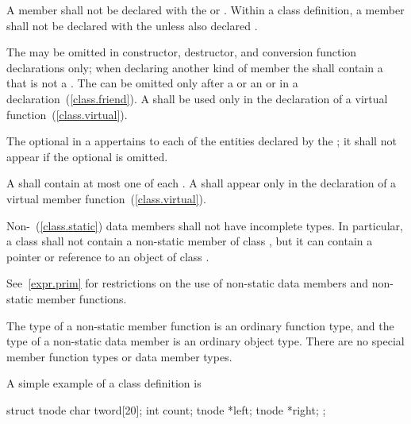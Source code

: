 \pnum
A member shall not be declared with the 
or 
. Within a class definition, a member shall not be declared with the   unless also declared .

\pnum
The  may be omitted in constructor, destructor,
and conversion function declarations only;
when declaring another kind of member the 
shall contain a  that is not a .
The
 can be omitted only after a
 or an  or in a
 declaration~(\ref{class.friend}). A
 shall be used only in the declaration of a
virtual function~(\ref{class.virtual}).

\pnum
The optional  in a 
appertains to each of the entities declared by the ;
it shall not appear if the optional  is omitted.

\pnum
A  shall contain at most one of each
.
A 
shall appear only in the declaration of a virtual member
function~(\ref{class.virtual}).

\pnum
{}%
Non-~(\ref{class.static}) data members shall not have
incomplete types. In particular, a class  shall not contain a
non-static member of class , but it can contain a pointer or
reference to an object of class .

\pnum
\enternote
See~\ref{expr.prim} for restrictions on the use of non-static data
members and non-static member functions.
\exitnote

\pnum
\enternote
The type of a non-static member function is an ordinary function type,
and the type of a non-static data member is an ordinary object type.
There are no special member function types or data member types.
\exitnote

\pnum
{}%
\enterexample
A simple example of a class definition is

\begin{codeblock}
struct tnode {
  char tword[20];
  int count;
  tnode *left;
  tnode *right;
};
\end{codeblock}

